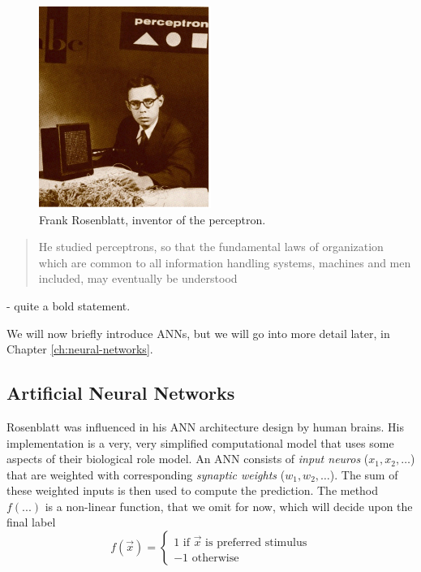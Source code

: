 \begin{minipage}{0.45\textwidth}
\begin{figure}[h]
  \centering
  \includegraphics[width=0.5\textwidth]{images/rosenblatt.jpg}
  \caption{Frank Rosenblatt, inventor of the perceptron.}
  \label{fig:rosenblatt}
\end{figure}
\end{minipage}
\hfill
\begin{minipage}{0.45\textwidth}
\begin{quote}
He studied perceptrons, so that the fundamental laws of organization which are common to all information handling systems, machines and men included, may eventually be understood
\end{quote}
- quite a bold statement.
\end{minipage}

We will now briefly introduce ANNs, but we will go into more detail later, in Chapter \ref{ch:neural-networks}.
\subsection{Artificial Neural Networks}
Rosenblatt was influenced in his ANN architecture design by human brains. His implementation is a very, very simplified computational model that uses some aspects of their biological role model.
An ANN consists of \textit{input neuros} ($x_1, x_2, \dots$) that are weighted with corresponding \textit{synaptic weights} ($w_1, w_2, \dots$).
The sum of these weighted inputs is then used to compute the prediction.
The method $f(...)$ is a non-linear function, that we omit for now, which will decide upon the final label
\begin{equation}
  f(\vec{x}) = \left\{\begin{matrix}
    1 \text{ if } \vec{x} \text{ is preferred stimulus}\\
    -1 \text{ otherwise}
  \end{matrix}\right.
\end{equation}

